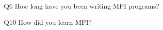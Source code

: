 \begin{description}%
\item{Q6} How long have you been writing MPI programs?%
\item{Q10} How did you learn MPI?%
\end{description}%
